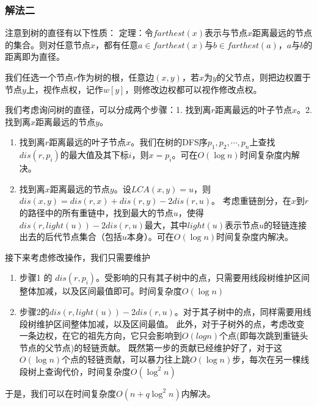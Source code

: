 \subsubsection{解法二}

注意到树的直径有以下性质：
定理：令$farthest(x)$表示与节点$x$距离最远的节点的集合。则对任意节点$x$，都有任意$a \in farthest(x)$与$b \in farthest(a)$，$a$与$b$的距离即为直径。\par

我们任选一个节点$r$作为树的根，任意边$(x,y)$，若$x$为$y$的父节点，则把边权置于节点$y$上，视作点权，记作$w[y]$，则修改边权都可以视作修改点权。\par

我们考虑询问树的直径，可以分成两个步骤：1. 找到离$r$距离最远的叶子节点$x$。2. 找到离$x$距离最远的节点$y$。\par

\begin{enumerate}
\item 找到离$r$距离最远的叶子节点$x$。我们在树的DFS序$p_1, p_2, \cdots, p_n$上查找$dis(r,p_i)$的最大值及其下标$i$，则$x = p_i$。可在$O(\log n)$时间复杂度内解决。
\item 找到离$x$距离最远的节点$y$。设$LCA(x, y) = u$，则$dis(x,y)=dis(r,x)+dis(r,y)−2dis(r,u)$。
考虑重链剖分，在$x$到$r$的路径中的所有重链中，找到最大的节点$u$，使得$dis(r,light(u)) − 2dis(r, u)$最大，其中$light(u)$表示节点$u$的轻链连接出去的后代节点集合（包括$u$本身）。可在$O(\log n)$时间复杂度内解决。
\end{enumerate}

接下来考虑修改操作，我们只需要维护

\begin{enumerate}
\item 步骤1 的 $dis(r,p_i)$。受影响的只有其子树中的点，只需要用线段树维护区间整体加减，以及区间最值即可。时间复杂度$O(\log n)$

\item 步骤2的$dis(r,light(u))−2dis(r,u)$。对于其子树中的点，同样需要用线段树维护区间整体加减，以及区间最值。
此外，对于子树外的点，考虑改变一条边权，在它的祖先方向，它只会影响到$O(log  n)$个点(即每次跳到重链头节点的父节点)的轻链贡献。
既然第一步的贡献已经维护好了，对于这$O(\log  n)$个点的轻链贡献，可以暴力往上跳$O(\log n)$步，每次在另一棵线段树上查询代价，时间复杂度$O(\log^2 n)$
\end{enumerate}

于是，我们可以在时间复杂度$O(n+q \log^2 n)$内解决。

